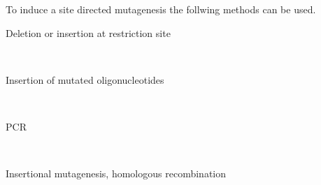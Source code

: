To induce a site directed mutagenesis the follwing methods can be used.

\begin{description}
	\item[Deletion or insertion at restriction site] \hfill \\
	\item[Insertion of mutated oligonucleotides] \hfill \\
	\item[PCR] \hfill \\
	\item[Insertional mutagenesis, homologous recombination] \hfill \\
\end{description}

